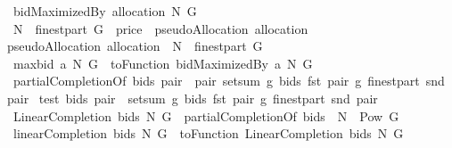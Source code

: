 \begin{isabellebody}
\isanewline
{}\isamarkupfalse%
\ {\isachardoublequoteopen}bidMaximizedBy\ allocation\ N\ G\ {\isacharequal}{\isacharequal}\ \isanewline
{\isacharparenleft}{\isacharasterisk}\ {\isacharparenleft}N\ {\isasymtimes}\ finestpart\ G{\isacharparenright}\ {\isasymtimes}\ {\isacharbraceleft}{}{\isacharcolon}{\isacharcolon}price{\isacharbraceright}\ {\isacharplus}{\isacharasterisk}\ {\isacharparenleft}{\isacharparenleft}pseudoAllocation\ allocation{\isacharparenright}\ {\isasymtimes}\ {\isacharbraceleft}{}{\isacharbraceright}{\isacharparenright}\ {\isacharasterisk}{\isacharparenright}\isanewline
pseudoAllocation\ allocation\ {\isacharless}{\isacharbar}{\isacharbar}\ {\isacharparenleft}{\isacharparenleft}N\ {\isasymtimes}\ {\isacharparenleft}finestpart\ G{\isacharparenright}{\isacharparenright}{\isacharparenright}{\isachardoublequoteclose}\isanewline
{}\isamarkupfalse%
\ {\isachardoublequoteopen}maxbid{\isacharprime}\ a\ N\ G\ {\isacharequal}{\isacharequal}\ toFunction\ {\isacharparenleft}bidMaximizedBy\ a\ N\ G{\isacharparenright}{\isachardoublequoteclose}\isanewline
{}\isamarkupfalse%
\ {\isachardoublequoteopen}partialCompletionOf\ bids\ pair\ {\isacharequal}{\isacharequal}\ {\isacharparenleft}pair{\isacharcomma}\ setsum\ {\isacharparenleft}{\isacharpercent}g{\isachardot}\ bids\ {\isacharparenleft}fst\ pair{\isacharcomma}\ g{\isacharparenright}{\isacharparenright}\ {\isacharparenleft}finestpart\ {\isacharparenleft}snd\ pair{\isacharparenright}{\isacharparenright}{\isacharparenright}{\isachardoublequoteclose}\isanewline
{}\isamarkupfalse%
\ {\isachardoublequoteopen}test\ bids\ pair\ {\isacharequal}{\isacharequal}\ setsum\ {\isacharparenleft}{\isacharpercent}g{\isachardot}\ bids\ {\isacharparenleft}fst\ pair{\isacharcomma}\ g{\isacharparenright}{\isacharparenright}\ {\isacharparenleft}finestpart\ {\isacharparenleft}snd\ pair{\isacharparenright}{\isacharparenright}{\isachardoublequoteclose}\isanewline
{}\isamarkupfalse%
\ {\isachardoublequoteopen}LinearCompletion\ bids\ N\ G\ {\isacharequal}{\isacharequal}\ {\isacharparenleft}partialCompletionOf\ bids{\isacharparenright}\ {\isacharbackquote}\ {\isacharparenleft}N\ {\isasymtimes}\ {\isacharparenleft}Pow\ G\ {\isacharminus}\ {\isacharbraceleft}{\isacharbraceleft}{\isacharbraceright}{\isacharbraceright}{\isacharparenright}{\isacharparenright}{\isachardoublequoteclose}\isanewline
{}\isamarkupfalse%
\ {\isachardoublequoteopen}linearCompletion{\isacharprime}\ bids\ N\ G\ {\isacharequal}{\isacharequal}\ toFunction\ {\isacharparenleft}LinearCompletion\ bids\ N\ G{\isacharparenright}{\isachardoublequoteclose}\isanewline

\end{isabellebody}
